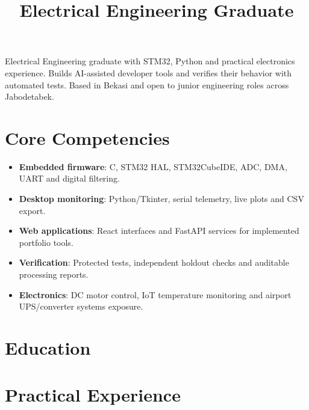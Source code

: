 \documentclass[11pt,a4paper,sans]{moderncv}
\title{Electrical Engineering Graduate}
\begin{document}
\makecvtitle

\small{Electrical Engineering graduate with STM32, Python and practical electronics
experience. Builds AI-assisted developer tools and verifies their behavior with
automated tests. Based in Bekasi and open to junior engineering roles across
Jabodetabek.}

\section{Core Competencies}
\begin{itemize}
\item \textbf{Embedded firmware}: C, STM32 HAL, STM32CubeIDE, ADC, DMA, UART and digital filtering.
\item \textbf{Desktop monitoring}: Python/Tkinter, serial telemetry, live plots and CSV export.
\item \textbf{Web applications}: React interfaces and FastAPI services for implemented portfolio tools.
\item \textbf{Verification}: Protected tests, independent holdout checks and auditable processing reports.
\item \textbf{Electronics}: DC motor control, IoT temperature monitoring and airport UPS/converter systems exposure.
\end{itemize}

\section{Education}

\section{Practical Experience}
\end{document}
